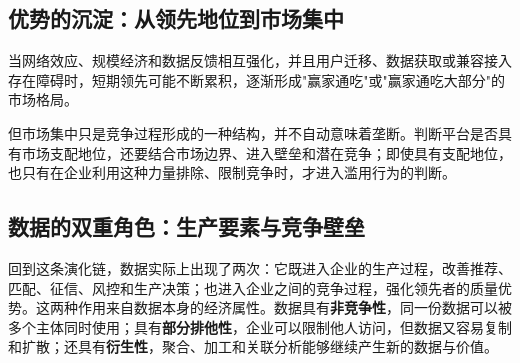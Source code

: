 \subsection{优势的沉淀：从领先地位到市场集中}

当网络效应、规模经济和数据反馈相互强化，并且用户迁移、数据获取或兼容接入存在障碍时，短期领先可能不断累积，逐渐形成"赢家通吃"或"赢家通吃大部分"的市场格局。

但市场集中只是竞争过程形成的一种结构，并不自动意味着垄断。判断平台是否具有市场支配地位，还要结合市场边界、进入壁垒和潜在竞争；即使具有支配地位，也只有在企业利用这种力量排除、限制竞争时，才进入滥用行为的判断。

\begin{center}
\end{center}

\subsection{数据的双重角色：生产要素与竞争壁垒}

回到这条演化链，数据实际上出现了两次：它既进入企业的生产过程，改善推荐、匹配、征信、风控和生产决策；也进入企业之间的竞争过程，强化领先者的质量优势。这两种作用来自数据本身的经济属性。数据具有\textbf{非竞争性}，同一份数据可以被多个主体同时使用；具有\textbf{部分排他性}，企业可以限制他人访问，但数据又容易复制和扩散；还具有\textbf{衍生性}，聚合、加工和关联分析能够继续产生新的数据与价值。

